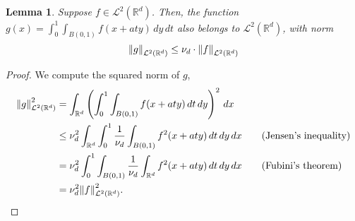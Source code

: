\documentclass{article}
\newcommand{\Reals}{\mathbb{R}}
\newcommand{\1}{\mathbf{1}}
\newcommand{\Rd}{\Reals^d}
\newcommand{\Leb}{\mathcal{L}}
\theoremstyle{alden}
\theoremstyle{aldenthm}
\newtheorem{lemma}{Lemma}
\theoremstyle{definition}
\theoremstyle{remark}
\begin{document}
\begin{lemma}
	\label{lem:remainder_term}
	Suppose $f \in \Leb^2(\Rd)$. Then, the function $g(x) = \int_{0}^{1} \int_{B(0,1)} f(x + aty) \,dy \,dt$ also belongs to $\Leb^2(\Rd)$, with norm
	\begin{equation*}
	\norm{g}_{\Leb^2(\Rd)} \leq \nu_d\cdot \norm{f}_{\Leb^2(\Rd)}
	\end{equation*}
\end{lemma}
\begin{proof}
	We compute the squared norm of $g$,
	\begin{align*}
	\norm{g}_{\Leb^2(\Rd)}^2 & = \int_{\Rd} \left(\int_{0}^{1} \int_{B(0,1)} f(x + aty) \,dt \,dy \right)^2 \,dx \\
	& \leq \nu_d^2 \int_{\Rd} \int_{0}^{1} \frac{1}{\nu_d}\int_{B(0,1)} f^2(x + aty) \,dt \,dy \,dx \tag{Jensen's inequality} \\
	& = \nu_d^2  \int_{0}^{1} \int_{B(0,1)} \frac{1}{\nu_d}\int_{\Rd}f^2(x + aty) \,dt \,dy \,dx \tag{Fubini's theorem} \\
	& = \nu_d^2 \norm{f}_{\Leb^2(\Rd)}^2.
	\end{align*}
\end{proof}
\end{document}

